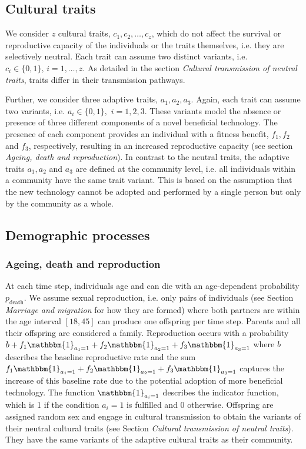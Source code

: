 \documentclass[9pt,twocolumn,twoside,lineno]{pnas-new}
\begin{document}
\subsection*{Cultural traits}

We consider $z$ cultural traits, $c_1,c_2,\ldots,c_z$, which do not affect the survival or reproductive capacity of the individuals or the traits themselves, i.e. they are selectively neutral. 
Each trait can assume two distinct variants, i.e. $c_i\in\{0,1\},\, i=1,\ldots,z$.
As detailed in the section \textit{Cultural transmission of neutral traits}, traits differ in their transmission pathways.

Further, we consider three adaptive traits, $a_1,a_2,a_3$. 
Again, each trait can assume two variants, i.e. $a_i\in\{0,1\},$ $i=1,2,3$. 
These variants model the absence or presence of three different components of a novel beneficial technology. 
The presence of each component provides an individual with a fitness benefit, $f_1,f_2$ and $f_3$, respectively, resulting in an increased reproductive capacity (see section \textit{Ageing, death and reproduction}). 
In contrast to the neutral traits, the adaptive traits $a_1,a_2$ and $a_3$ are defined at the community level, i.e. all individuals within a community have the same trait variant. 
This is based on the assumption that the new technology cannot be adopted and performed by a single person but only by the community as a whole.

\subsection*{Demographic processes}

\subsubsection*{Ageing, death and reproduction} 
At each time step, individuals age and can die with an age-dependent probability $p_\text{death}$.
We assume sexual reproduction, i.e. only pairs of individuals (see Section \textit{Marriage and migration} for how they are formed) where both partners are within the age interval $[18,45]$ can produce one offspring per time step. Parents and all their offspring are considered a family.
Reproduction occurs with a probability $b+f_1 \mathbbm{1}_{a_1=1}+f_2 \mathbbm{1}_{a_2=1}+f_3 \mathbbm{1}_{a_3=1}$ where $b$ describes the baseline reproductive rate and the sum $f_1 \mathbbm{1}_{a_1=1}+f_2 \mathbbm{1}_{a_2=1}+f_3 \mathbbm{1}_{a_3=1}$ captures the increase of this baseline rate due to the potential adoption of more beneficial technology. 
The function $\mathbbm{1}_{a_i=1}$ describes the indicator function, which is 1 if the condition $a_i=1$ is fulfilled and 0 otherwise. 
Offspring are assigned random sex and engage in cultural transmission to obtain the variants of their neutral cultural traits (see Section \textit{Cultural transmission of neutral traits}). 
They have the same variants of the adaptive cultural traits as their community. 
\end{document}
